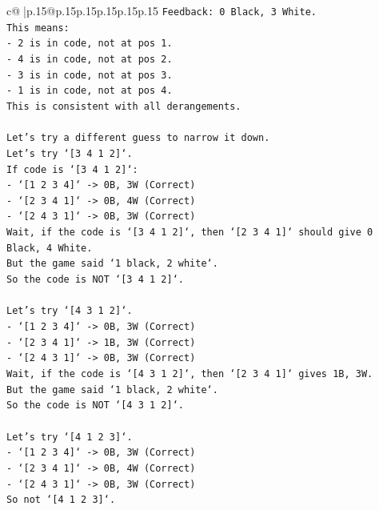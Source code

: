 \documentclass{article}
\begin{document}
{\begin{supertabular}{c@{$\;$}|p{.15\linewidth}@{}p{.15\linewidth}p{.15\linewidth}p{.15\linewidth}p{.15\linewidth}p{.15\linewidth}}
{{{\texttt{Feedback: 0 Black, 3 White.} \\
\texttt{This means:} \\
\texttt{{-} 2 is in code, not at pos 1.} \\
\texttt{{-} 4 is in code, not at pos 2.} \\
\texttt{{-} 3 is in code, not at pos 3.} \\
\texttt{{-} 1 is in code, not at pos 4.} \\
\texttt{This is consistent with all derangements.} \\
\\ 
\texttt{Let's try a different guess to narrow it down.} \\
\texttt{Let's try `{[}3 4 1 2{]}`.} \\
\texttt{If code is `{[}3 4 1 2{]}`:} \\
\texttt{{-} `{[}1 2 3 4{]}` {-}> 0B, 3W (Correct)} \\
\texttt{{-} `{[}2 3 4 1{]}` {-}> 0B, 4W (Correct)} \\
\texttt{{-} `{[}2 4 3 1{]}` {-}> 0B, 3W (Correct)} \\
\texttt{Wait, if the code is `{[}3 4 1 2{]}`, then `{[}2 3 4 1{]}` should give 0 Black, 4 White.} \\
\texttt{But the game said `1 black, 2 white`.} \\
\texttt{So the code is NOT `{[}3 4 1 2{]}`.} \\
\\ 
\texttt{Let's try `{[}4 3 1 2{]}`.} \\
\texttt{{-} `{[}1 2 3 4{]}` {-}> 0B, 3W (Correct)} \\
\texttt{{-} `{[}2 3 4 1{]}` {-}> 1B, 3W (Correct)} \\
\texttt{{-} `{[}2 4 3 1{]}` {-}> 0B, 3W (Correct)} \\
\texttt{Wait, if the code is `{[}4 3 1 2{]}`, then `{[}2 3 4 1{]}` gives 1B, 3W.} \\
\texttt{But the game said `1 black, 2 white`.} \\
\texttt{So the code is NOT `{[}4 3 1 2{]}`.} \\
\\ 
\texttt{Let's try `{[}4 1 2 3{]}`.} \\
\texttt{{-} `{[}1 2 3 4{]}` {-}> 0B, 3W (Correct)} \\
\texttt{{-} `{[}2 3 4 1{]}` {-}> 0B, 4W (Correct)} \\
\texttt{{-} `{[}2 4 3 1{]}` {-}> 0B, 3W (Correct)} \\
\texttt{So not `{[}4 1 2 3{]}`.} \\
}}}
\end{supertabular}}
\end{document}
